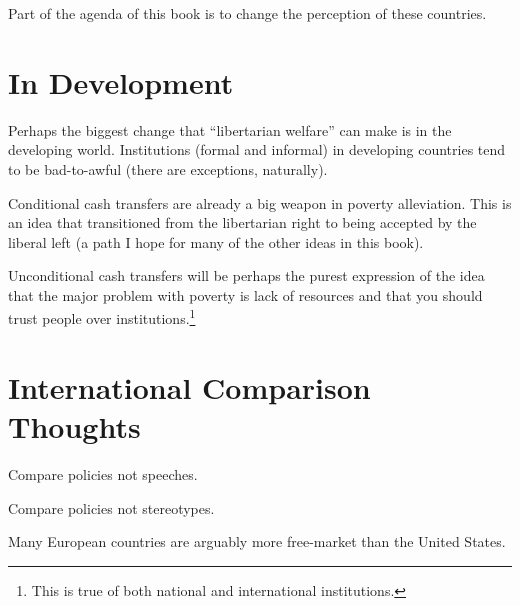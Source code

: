 Part of the agenda of this book is to change the perception of these countries.

\section{In Development}

Perhaps the biggest change that ``libertarian welfare'' can make is in the
developing world. Institutions (formal and informal) in developing countries
tend to be bad-to-awful (there are exceptions, naturally).

Conditional cash transfers are already a big weapon in poverty alleviation.
This is an idea that transitioned from the libertarian right to being accepted
by the liberal left (a path I hope for many of the other ideas in this book).

Unconditional cash transfers will be perhaps the purest expression of the idea
that the major problem with poverty is lack of resources and that you should
trust people over institutions.\footnote{This is true of both national and
international institutions.} 

\section{International Comparison Thoughts}

\thought Compare policies not speeches.

\thought Compare policies not stereotypes.

\thought Many European countries are arguably more free-market than the United
States.

